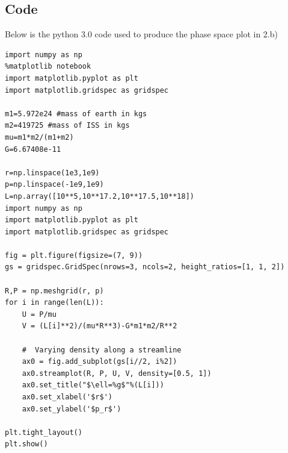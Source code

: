 \documentclass[11pt,a4paper]{report}
\begin{document}
\subsection*{Code}
Below is the python 3.0 code used to produce the phase space plot in 2.b)
\begin{lstlisting}
import numpy as np
%matplotlib notebook
import matplotlib.pyplot as plt
import matplotlib.gridspec as gridspec

m1=5.972e24 #mass of earth in kgs
m2=419725 #mass of ISS in kgs
mu=m1*m2/(m1+m2)
G=6.67408e-11

r=np.linspace(1e3,1e9)
p=np.linspace(-1e9,1e9)
L=np.array([10**5,10**17.2,10**17.5,10**18])
import numpy as np
import matplotlib.pyplot as plt
import matplotlib.gridspec as gridspec

fig = plt.figure(figsize=(7, 9))
gs = gridspec.GridSpec(nrows=3, ncols=2, height_ratios=[1, 1, 2])

R,P = np.meshgrid(r, p)
for i in range(len(L)):
    U = P/mu
    V = (L[i]**2)/(mu*R**3)-G*m1*m2/R**2

    #  Varying density along a streamline
    ax0 = fig.add_subplot(gs[i//2, i%2])
    ax0.streamplot(R, P, U, V, density=[0.5, 1])
    ax0.set_title("$\ell=%g$"%(L[i]))
    ax0.set_xlabel('$r$')
    ax0.set_ylabel('$p_r$')
  
plt.tight_layout()
plt.show()
\end{lstlisting}
\end{document}
